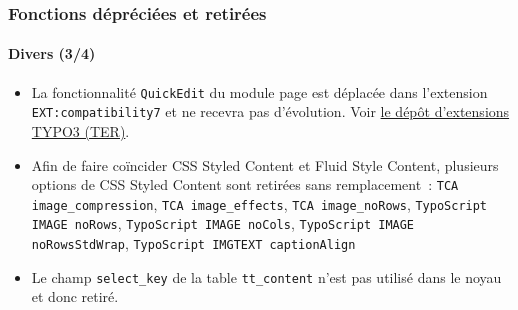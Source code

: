 \begin{frame}[fragile]
	\frametitle{Fonctions dépréciées et retirées}
	\framesubtitle{Divers (3/4)}

	\begin{itemize}
		\item La fonctionnalité \texttt{QuickEdit} du module page est déplacée dans
			l'extension \texttt{EXT:compatibility7} et ne recevra pas d'évolution.\newline
			Voir \href{https://typo3.org/extensions/repository}{le dépôt d'extensions TYPO3 (TER)}.

		\item Afin de faire coïncider CSS Styled Content et Fluid Style Content, plusieurs
			options de CSS Styled Content sont retirées sans remplacement~:
			\texttt{TCA image\_compression}, \texttt{TCA image\_effects}, \texttt{TCA image\_noRows},
			\texttt{TypoScript IMAGE noRows}, \texttt{TypoScript IMAGE noCols},
			\texttt{TypoScript IMAGE noRowsStdWrap}, \texttt{TypoScript IMGTEXT captionAlign}

		\item Le champ \texttt{select\_key} de la table \texttt{tt\_content} n'est pas utilisé
			dans le noyau et donc retiré.

	\end{itemize}

\end{frame}


